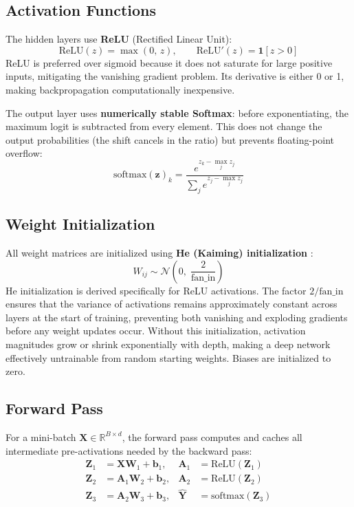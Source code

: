 \documentclass[12pt]{article}
\begin{document}
\subsection{Activation Functions}

The hidden layers use \textbf{ReLU} (Rectified Linear Unit):
\[
  \text{ReLU}(z) = \max(0,\, z), \qquad
  \text{ReLU}'(z) = \mathbf{1}[z > 0]
\]
ReLU is preferred over sigmoid because it does not saturate for large positive inputs,
mitigating the vanishing gradient problem. Its derivative is either 0 or 1, making
backpropagation computationally inexpensive.

The output layer uses \textbf{numerically stable Softmax}: before exponentiating, the
maximum logit is subtracted from every element. This does not change the output
probabilities (the shift cancels in the ratio) but prevents floating-point overflow:
\[
  \text{softmax}(\mathbf{z})_k
  = \frac{e^{z_k - \max_j z_j}}{\displaystyle\sum_j e^{z_j - \max_j z_j}}
\]

\subsection{Weight Initialization}

All weight matrices are initialized using \textbf{He (Kaiming) initialization}
\cite{he2015}:
\[
  W_{ij} \sim \mathcal{N}\!\!\left(0,\; \frac{2}{\text{fan\_in}}\right)
\]
He initialization is derived specifically for ReLU activations. The factor $2/\text{fan\_in}$
ensures that the variance of activations remains approximately constant across layers at
the start of training, preventing both vanishing and exploding gradients before any
weight updates occur. Without this initialization, activation magnitudes grow or shrink
exponentially with depth, making a deep network effectively untrainable from random
starting weights. Biases are initialized to zero.

\subsection{Forward Pass}

For a mini-batch $\mathbf{X} \in \mathbb{R}^{B \times d}$, the forward pass computes
and caches all intermediate pre-activations needed by the backward pass:
\begin{align*}
  \mathbf{Z}_1 &= \mathbf{X}\mathbf{W}_1 + \mathbf{b}_1, &
  \mathbf{A}_1 &= \text{ReLU}(\mathbf{Z}_1) \\
  \mathbf{Z}_2 &= \mathbf{A}_1\mathbf{W}_2 + \mathbf{b}_2, &
  \mathbf{A}_2 &= \text{ReLU}(\mathbf{Z}_2) \\
  \mathbf{Z}_3 &= \mathbf{A}_2\mathbf{W}_3 + \mathbf{b}_3, &
  \hat{\mathbf{Y}} &= \text{softmax}(\mathbf{Z}_3)
\end{align*}
\end{document}
